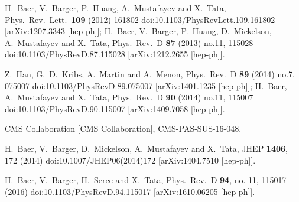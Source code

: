 \documentclass{PoS}
\begin{document}
  \begin{thebibliography}{99}

  H.~Baer, V.~Barger, P.~Huang, A.~Mustafayev and X.~Tata,
  Phys.\ Rev.\ Lett.\  {\bf 109} (2012) 161802
  doi:10.1103/PhysRevLett.109.161802
  [arXiv:1207.3343 [hep-ph]];
H.~Baer, V.~Barger, P.~Huang, D.~Mickelson, A.~Mustafayev and X.~Tata,
  Phys.\ Rev.\ D {\bf 87} (2013) no.11,  115028
  doi:10.1103/PhysRevD.87.115028
  [arXiv:1212.2655 [hep-ph]].


Z.~Han, G.~D.~Kribs, A.~Martin and A.~Menon,
  Phys.\ Rev.\ D {\bf 89} (2014) no.7,  075007
  doi:10.1103/PhysRevD.89.075007
  [arXiv:1401.1235 [hep-ph]];
  H.~Baer, A.~Mustafayev and X.~Tata,
  Phys.\ Rev.\ D {\bf 90} (2014) no.11,  115007
  doi:10.1103/PhysRevD.90.115007
  [arXiv:1409.7058 [hep-ph]].
  

  CMS Collaboration [CMS Collaboration],
  CMS-PAS-SUS-16-048.


 
  H.~Baer, V.~Barger, D.~Mickelson, A.~Mustafayev and X.~Tata,
  JHEP {\bf 1406}, 172 (2014)
  doi:10.1007/JHEP06(2014)172
  [arXiv:1404.7510 [hep-ph]].


  H.~Baer, V.~Barger, H.~Serce and X.~Tata,
  Phys.\ Rev.\ D {\bf 94}, no. 11, 115017 (2016)
  doi:10.1103/PhysRevD.94.115017
  [arXiv:1610.06205 [hep-ph]].
  

\end{thebibliography}
\end{document}
